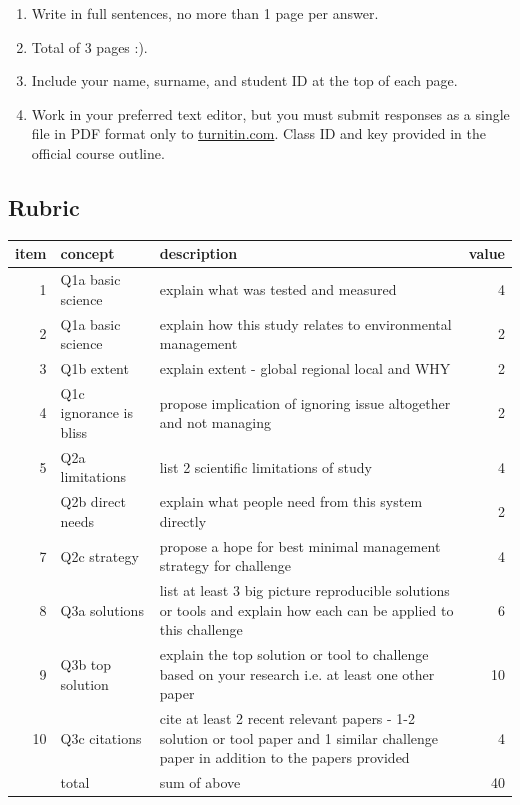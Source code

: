\documentclass[
]{book}
\providecommand{\tightlist}{%
  \setlength{\itemsep}{0pt}\setlength{\parskip}{0pt}}
\begin{document}
\begin{enumerate}
\def\labelenumi{\arabic{enumi}.}
\tightlist
\item
  Write in full sentences, no more than 1 page per answer.
\item
  Total of 3 pages :).\\
\item
  Include your name, surname, and student ID at the top of each page.
\item
  Work in your preferred text editor, but you must submit responses as a single file in PDF format only to \href{https://www.turnitin.com}{turnitin.com}. Class ID and key provided in the official course outline.
\end{enumerate}

\hypertarget{rubric}{%
\subsection*{Rubric}\label{rubric}}

\begin{tabular}{rllr}
\toprule
item & concept & description & value\\
\midrule
1 & Q1a basic science & explain what was tested and measured & 4\\
2 & Q1a basic science & explain how this study relates to environmental management & 2\\
3 & Q1b extent & explain extent - global regional local and WHY & 2\\
4 & Q1c ignorance is bliss & propose implication of ignoring issue altogether and not managing & 2\\
5 & Q2a limitations & list 2 scientific limitations of study & 4\\
\addlinespace
6 & Q2b direct needs & explain what people need from this system directly & 2\\
7 & Q2c strategy & propose a hope for best minimal management strategy for challenge & 4\\
8 & Q3a solutions & list at least 3 big picture reproducible solutions or tools and explain how each can be applied to this challenge & 6\\
9 & Q3b top solution & explain the top solution or tool to challenge based on your research i.e. at least one other paper & 10\\
10 & Q3c citations & cite at least 2 recent relevant papers - 1-2 solution or tool paper and 1 similar challenge paper in addition to the papers provided & 4\\
\addlinespace
11 & total & sum of above & 40\\
\bottomrule
\end{tabular}
\end{document}
